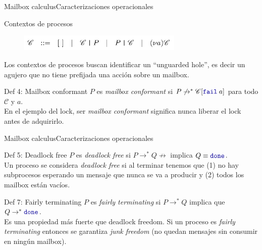 \documentclass{beamer}
\newcommand{\done}{\texttt{\textcolor{keyword}{done}}}
\newcommand{\fail}[1]{\texttt{\textcolor{keyword}{fail}}\hspace{0.25em}#1}
\begin{document}
\begin{frame}{Mailbox calculus}{Caracterizaciones operacionales}
    \begin{block}{Contextos de procesos}
        \vspace{-0.5em}
        \begin{figure}[H]
            \includegraphics[width=0.7\textwidth,left]{process-context}
        \end{figure}
        \vspace{-1em}
        Los contextos de procesos buscan identificar un ``unguarded hole'', es decir un agujero que no tiene prefijada una acción sobre un mailbox.
    \end{block}
    \begin{block}{Def 4: Mailbox conformant}
        $P$ es \emph{mailbox conformant} si $P \not\rightarrow^\ast \mathscr{C}[\fail{a}]$ para todo $\mathscr{C}$ y $a$.
        \\
        En el ejemplo del lock, ser \emph{mailbox conformant} significa nunca liberar el lock antes de adquirirlo.
    \end{block}
\end{frame}

\begin{frame}{Mailbox calculus}{Caracterizaciones operacionales}
    \begin{block}{Def 5: Deadlock free}
        $P$ es \emph{deadlock free} si $P \rightarrow^\ast Q \not\rightarrow$ implica $Q \equiv \done$.
        \\
        Un proceso se considera \emph{deadlock free} si al terminar tenemos que (1) no hay subprocesos esperando un mensaje que nunca se va a producir y (2) todos los mailbox están vacíos.
    \end{block}
    \begin{block}{Def 7: Fairly terminating}
        $P$ es \emph{fairly terminating} si $P \rightarrow^\ast Q$ implica que $Q \rightarrow^\ast \done$.
        \\
        Es una propiedad más fuerte que deadlock freedom. Si un proceso es \emph{fairly terminating} entonces se garantiza \emph{junk freedom} (no quedan mensajes sin consumir en ningún mailbox).
    \end{block}
\end{frame}
\end{document}
